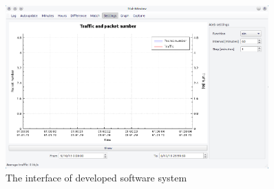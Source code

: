 \documentclass[runningheads,a4paper]{llncs}
\begin{document}
\begin{figure}
\centering
\includegraphics[height=0.4\textheight, width=0.9\textwidth]{fig1}
\caption{The interface of developed software system}
\label{fig:1}
\end{figure}
\end{document}
